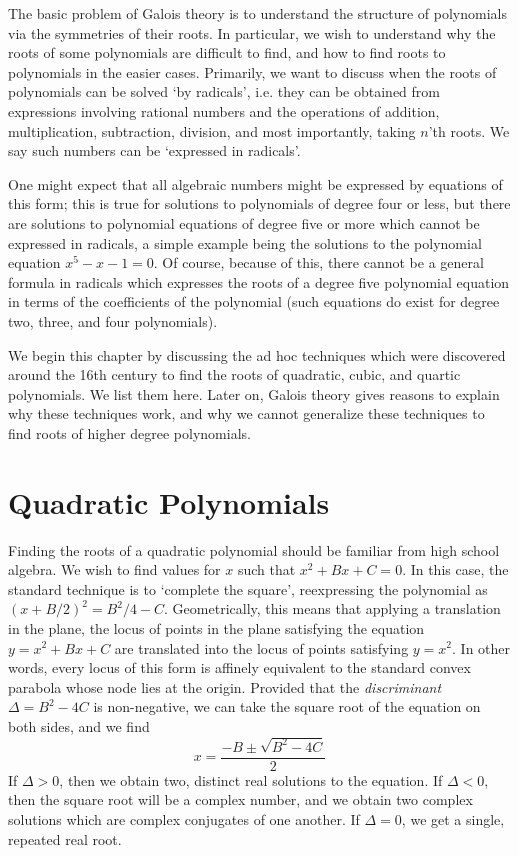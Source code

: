 
The basic problem of Galois theory is to understand the structure of polynomials via the symmetries of their roots. In particular, we wish to understand why the roots of some polynomials are difficult to find, and how to find roots to polynomials in the easier cases. Primarily, we want to discuss when the roots of polynomials can be solved `by radicals', i.e. they can be obtained from expressions involving rational numbers and the operations of addition, multiplication, subtraction, division, and most importantly, taking $n$'th roots. We say such numbers can be `expressed in radicals'.

One might expect that all algebraic numbers might be expressed by equations of this form; this is true for solutions to polynomials of degree four or less, but there are solutions to polynomial equations of degree five or more which cannot be expressed in radicals, a simple example being the solutions to the polynomial equation $x^5 - x - 1 = 0$. Of course, because of this, there cannot be a general formula in radicals which expresses the roots of a degree five polynomial equation in terms of the coefficients of the polynomial (such equations do exist for degree two, three, and four polynomials).

We begin this chapter by discussing the ad hoc techniques which were discovered around the 16th century to find the roots of quadratic, cubic, and quartic polynomials. We list them here. Later on, Galois theory gives reasons to explain why these techniques work, and why we cannot generalize these techniques to find roots of higher degree polynomials.

\section{Quadratic Polynomials}

Finding the roots of a quadratic polynomial should be familiar from high school algebra. We wish to find values for $x$ such that $x^2 + Bx + C  = 0$. In this case, the standard technique is to `complete the square', reexpressing the polynomial as $\left( x + B/2 \right)^2 = B^2/4 - C$. Geometrically, this means that applying a translation in the plane, the locus of points in the plane satisfying the equation $y = x^2 + Bx + C$ are translated into the locus of points satisfying $y = x^2$. In other words, every locus of this form is affinely equivalent to the standard convex parabola whose node lies at the origin. Provided that the {\it discriminant} $\Delta = B^2 - 4C$ is non-negative, we can take the square root of the equation on both sides, and we find
%
\[ x = \frac{-B \pm \sqrt{B^2 - 4C}}{2} \]
%
If $\Delta > 0$, then we obtain two, distinct real solutions to the equation. If $\Delta < 0$, then the square root will be a complex number, and we obtain two complex solutions which are complex conjugates of one another. If $\Delta = 0$, we get a single, repeated real root.

